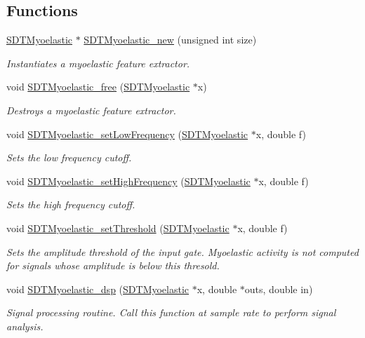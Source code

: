 \subsection*{Functions}
\begin{DoxyCompactItemize}
\item 
\hyperlink{group__myoelastic_gaaaf3320e161f43bf74a8c802519e5c3e}{S\+D\+T\+Myoelastic} $\ast$ \hyperlink{group__myoelastic_ga9b10fe4d528fa1b5a19ea619a3de4601}{S\+D\+T\+Myoelastic\+\_\+new} (unsigned int size)
\begin{DoxyCompactList}\small\item\em Instantiates a myoelastic feature extractor. \end{DoxyCompactList}\item 
void \hyperlink{group__myoelastic_ga98a69e569953c88684003bf467d87263}{S\+D\+T\+Myoelastic\+\_\+free} (\hyperlink{group__myoelastic_gaaaf3320e161f43bf74a8c802519e5c3e}{S\+D\+T\+Myoelastic} $\ast$x)
\begin{DoxyCompactList}\small\item\em Destroys a myoelastic feature extractor. \end{DoxyCompactList}\item 
void \hyperlink{group__myoelastic_gafb33a8f68eddfbdb2e190c1b8ee6d6a9}{S\+D\+T\+Myoelastic\+\_\+set\+Low\+Frequency} (\hyperlink{group__myoelastic_gaaaf3320e161f43bf74a8c802519e5c3e}{S\+D\+T\+Myoelastic} $\ast$x, double f)
\begin{DoxyCompactList}\small\item\em Sets the low frequency cutoff. \end{DoxyCompactList}\item 
void \hyperlink{group__myoelastic_gafba72e2959eea8451c07411b992fa96e}{S\+D\+T\+Myoelastic\+\_\+set\+High\+Frequency} (\hyperlink{group__myoelastic_gaaaf3320e161f43bf74a8c802519e5c3e}{S\+D\+T\+Myoelastic} $\ast$x, double f)
\begin{DoxyCompactList}\small\item\em Sets the high frequency cutoff. \end{DoxyCompactList}\item 
void \hyperlink{group__myoelastic_gae209925f758db266b9f9c5f70443b0f3}{S\+D\+T\+Myoelastic\+\_\+set\+Threshold} (\hyperlink{group__myoelastic_gaaaf3320e161f43bf74a8c802519e5c3e}{S\+D\+T\+Myoelastic} $\ast$x, double f)
\begin{DoxyCompactList}\small\item\em Sets the amplitude threshold of the input gate. Myoelastic activity is not computed for signals whose amplitude is below this thresold. \end{DoxyCompactList}\item 
void \hyperlink{group__myoelastic_ga2ad77892da5bfe3df69088504a8ad19a}{S\+D\+T\+Myoelastic\+\_\+dsp} (\hyperlink{group__myoelastic_gaaaf3320e161f43bf74a8c802519e5c3e}{S\+D\+T\+Myoelastic} $\ast$x, double $\ast$outs, double in)
\begin{DoxyCompactList}\small\item\em Signal processing routine. Call this function at sample rate to perform signal analysis. \end{DoxyCompactList}\end{DoxyCompactItemize}


